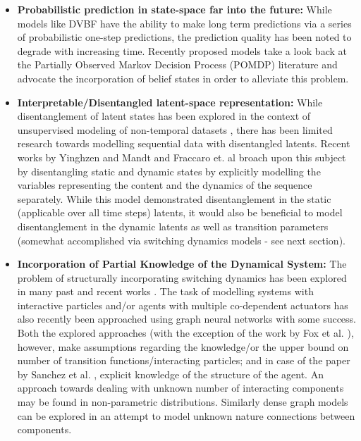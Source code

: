 \documentclass[10pt,twocolumn,letterpaper]{article}
\begin{document}
\begin{itemize}
		\item \textbf{Probabilistic prediction in state-space far into the future:} While models like DVBF \cite{karl2016deep} have the ability to make long term predictions via a series of probabilistic one-step predictions, the prediction quality has been noted to degrade with increasing time. Recently proposed models \cite{tdvae, neuralpredbelief} take a look back at the Partially Observed Markov Decision Process (POMDP) literature and advocate the incorporation of belief states in order to alleviate this problem.
		\item \textbf{Interpretable/Disentangled latent-space representation:} While disentanglement of latent states has been explored in the context of unsupervised modeling of non-temporal datasets \cite{higgins2017beta, kim2018disentangling}, there has been limited research towards modelling sequential data with disentangled latents. Recent works by Yinghzen and Mandt \cite{yingzhen2018disentangled} and Fraccaro et. al \cite{fraccaro2017disentangled} broach upon this subject by disentangling static and dynamic states by explicitly modelling the variables representing the content and the dynamics of the sequence separately. While this model demonstrated disentanglement in the static (applicable over all time steps) latents, it would also be beneficial to model disentanglement in the dynamic latents as well as transition parameters (somewhat accomplished via switching dynamics models - see next section). 
		\item \textbf{Incorporation of Partial Knowledge of the Dynamical System:} The problem of structurally incorporating switching dynamics has been explored in many past and recent works \cite{fox2009nonparametric, linderman2016recurrent, becker-ehmck2019switching}. The task of modelling systems with interactive particles and/or agents with multiple co-dependent actuators has also recently been approached using graph neural networks \cite{kipf2018neural, sanchez2018graph} with some success. Both the explored approaches (with the exception of the work by Fox et al. \cite{fox2009nonparametric}), however, make assumptions regarding the knowledge/or the upper bound on number of transition functions/interacting particles; and in case of the paper by Sanchez et al. \cite{sanchez2018graph}, explicit knowledge of the structure of the agent. An approach towards dealing with  unknown number of interacting components may be found in non-parametric distributions. Similarly dense graph models can be explored in an attempt to model unknown nature connections between components.
	\end{itemize}
	
\end{document}
